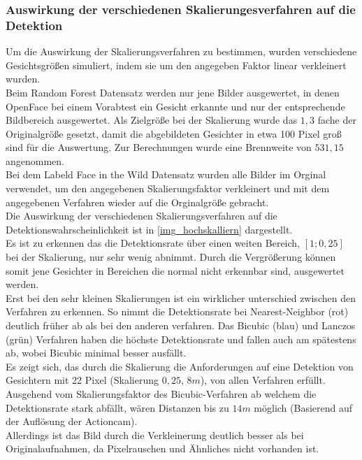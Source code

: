 \subsubsection{Auswirkung der verschiedenen Skalierungesverfahren auf die Detektion}
\label{OpenFace_skal}
Um die Auswirkung der Skalierungsverfahren zu bestimmen, wurden verschiedene Gesichtsgrößen simuliert, indem sie um den angegeben Faktor linear verkleinert wurden.\\
Beim Random Forest Datensatz \cite{database_Face_Ori} werden nur jene Bilder ausgewertet, in denen OpenFace bei einem Vorabtest ein Gesicht erkannte und nur der entsprechende Bildbereich ausgewertet. Als Zielgröße bei der Skalierung wurde das $1,3$ fache der Originalgröße gesetzt, damit die abgebildeten Gesichter in etwa 100 Pixel groß sind für die Auswertung. Zur Berechnungen wurde eine Brennweite von $531,15$ angenommen.\\
Bei dem Labeld Face in the Wild \cite{database_Face} Datensatz wurden alle Bilder im Orginal verwendet, um den angegebenen Skalierungsfaktor verkleinert und mit dem angegebenen Verfahren wieder auf die Orginalgröße gebracht.\\
Die Auswirkung der verschiedenen Skalierungsverfahren auf die Detektionswahrscheinlichkeit ist in \autoref{img_hochskalliern} dargestellt.\\
Es ist zu erkennen das die Detektionsrate über einen weiten Bereich, $[1;0,25]$ bei der Skalierung, nur sehr wenig abnimmt. Durch die Vergrößerung können somit jene Gesichter in Bereichen die normal nicht erkennbar sind, ausgewertet werden.\\
Erst bei den sehr kleinen Skalierungen ist ein wirklicher unterschied zwischen den Verfahren zu erkennen. So nimmt die Detektionsrate bei  Nearest-Neighbor (rot) deutlich früher ab als bei den anderen verfahren. Das Bicubic (blau) und Lanczos (grün) Verfahren haben die höchste Detektionsrate und fallen auch am spätestens ab, wobei Bicubic minimal besser ausfällt.\\
Es zeigt sich, das durch die Skalierung die Anforderungen auf eine Detektion von Gesichtern mit 22 Pixel (Skalierung $0,25$, $8m$), von allen Verfahren erfüllt.\\
Ausgehend vom Skalierungsfaktor des Bicubic-Verfahren ab welchem die Detektionsrate stark abfällt, wären Distanzen bis zu $14m$ möglich (Basierend auf der Auflösung der Actioncam).\\
Allerdings ist das Bild durch die Verkleinerung deutlich besser als bei Originalaufnahmen, da Pixelrauschen und Ähnliches nicht vorhanden ist.
